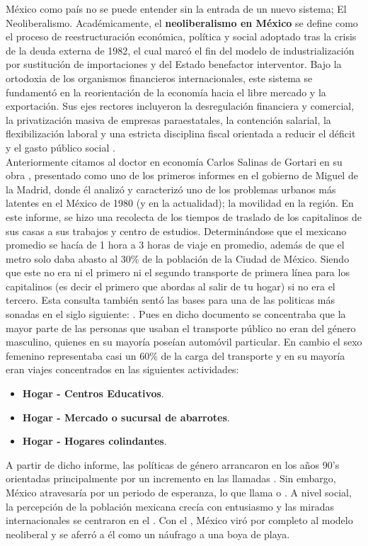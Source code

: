 México como país no se puede entender sin la entrada de un nuevo sistema; El Neoliberalismo. Académicamente, el \textbf{neoliberalismo en México} 
se define como el proceso de reestructuración económica, política y social adoptado tras la crisis de la deuda externa de 1982, el cual marcó el fin del 
modelo de industrialización por sustitución de importaciones y del Estado benefactor interventor. Bajo la ortodoxia de los organismos financieros internacionales, 
este sistema se fundamentó en la reorientación de la economía hacia el libre mercado y la exportación. Sus ejes rectores incluyeron la desregulación financiera y comercial, 
la privatización masiva de empresas paraestatales, la contención salarial, la flexibilización laboral y una estricta disciplina fiscal orientada a reducir el déficit y el 
gasto público social \cite{tello2007estado}. \\
Anteriormente citamos al doctor en economía Carlos Salinas de Gortari en su obra \cite{salinas1980produccion}, presentado como uno de los primeros informes en el
gobierno de Miguel de la Madrid, donde él analizó y caracterizó uno de los problemas urbanos más latentes en el México de 1980 (y en la actualidad); la movilidad 
en la región. En este informe, se hizo una recolecta de los tiempos de traslado de los capitalinos de sus casas a sus trabajos y centro de estudios. Determinándose 
que el mexicano promedio se hacía de 1 hora a 3 horas de viaje en promedio, además de que el metro solo daba abasto al 30\% de la población de la Ciudad de México. 
Siendo que este no era ni el primero ni el segundo transporte de primera línea para los capitalinos (es decir el primero que abordas al salir de tu hogar) si no era el 
tercero. Esta consulta también sentó las bases para una de las politicas más sonadas en el siglo siguiente: . 
Pues en dicho documento se concentraba que la mayor parte de las personas que usaban el transporte público no eran del género masculino, quienes en su mayoría poseían 
automóvil particular. En cambio el sexo femenino representaba casi un 60\% de la carga del transporte y en su mayoría eran viajes concentrados en las siguientes actividades:
\begin{itemize}
      \item \textbf{Hogar - Centros Educativos}.
      \item \textbf{Hogar - Mercado o sucursal de abarrotes}. 
      \item \textbf{Hogar - Hogares colindantes}.
\end{itemize}
A partir de dicho informe, las políticas de género arrancaron en los años 90's orientadas principalmente por un incremento en las llamadas .
Sin embargo, México atravesaría por un periodo de esperanza, lo que \cite{molina2018} llama  o . A nivel
social, la percepción de la población mexicana crecía con entusiasmo y las miradas internacionales se centraron en el .
Con el , México viró por completo al modelo neoliberal y se aferró a él como un náufrago a una boya de playa.


